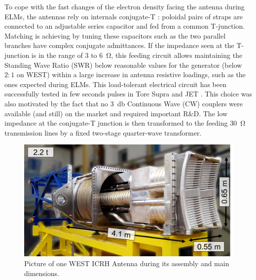 \documentclass[12p]{iopart}
\begin{document}
To cope with the fast changes of the electron density facing the antenna during ELMs, the antennas rely on internals conjugate-T \cite{bosia2003-1}: poloidal pairs of straps are connected to an adjustable series capacitor and fed from a common T-junction. Matching is achieving by tuning these capacitors such as the two parallel branches have complex conjugate admittances. If the impedance seen at the T-junction is in the range of 3 to \SI{6}{\ohm}, this feeding circuit allows maintaining the Standing Wave Ratio (SWR) below reasonable values for the generator (below $2{:}1$ on WEST) within a large increase in antenna resistive loadings, such as the ones expected during ELMs. This load-tolerant electrical circuit has been successfully tested in few seconds pulses in Tore Supra \cite{vulliez2008} and JET \cite{durodie2012-1}. This choice was also motivated by the fact that no \SI{3}{\decibel} Continuous Wave (CW) couplers were available (and still) on the market and required important R\&D. The low impedance at the conjugate-T junction is then transformed to the feeding \SI{30}{\ohm} transmission lines by a fixed two-stage quarter-wave transformer.


\begin{figure}
	\centering
	\includegraphics[width=0.95\linewidth]{figures/antenna}
	\caption{Picture of one WEST ICRH Antenna during its assembly and main dimensions.}
	\label{fig:antenna}
\end{figure}
\end{document}
